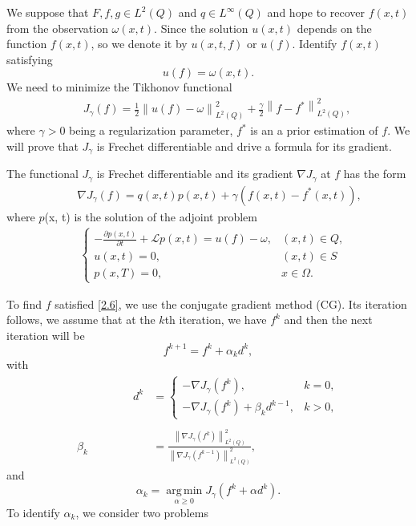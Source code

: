\documentclass[notitlepage,a4paper,fleqn,9pt]{icmfarticle}
\begin{document}
\begin{multicols}{2}
We suppose that $F, f, g \in L^2(Q)$ and $ q\in L^\infty(Q)$ and hope to recover $f(x, t)$ from the observation $\omega(x, t)$. Since the solution $u(x, t)$ depends on the function $f(x, t)$, so we denote it by $u(x, t, f)$ or $u(f)$. Identify $f(x, t)$ satisfying 
$$u(f)=\omega(x, t).$$ 
We need to minimize the Tikhonov functional
\begin{align}\label{2.6}
	\quad\;\; J_{\gamma}(f)=\frac{1}{2}\left\|u(f)-\omega\right\|_{L^2(Q)}^2+\frac{\gamma}{2}\left\|f-f^*\right\|_{L^2(Q)}^2,
\end{align}
where $\gamma>0$ being a regularization parameter, $f^*$ is an a prior estimation of $f$.
We will prove that $J_\gamma$ is Frechet differentiable and drive a formula for its gradient.
\begin{dl}
	The functional $J_\gamma$ is Frechet differentiable and its gradient $\nabla J_\gamma$ at $f$ has the form 
	\begin{align}\label{2.7}
		\qquad \nabla J_\gamma(f)=q(x, t)p(x, t)+\gamma \left(f(x, t)-f^*(x, t)\right),
	\end{align}
	where $p$(x, t) is the solution of the adjoint problem
	\begin{align}\label{2.5} 
		\quad\begin{cases}
		-\frac{\partial p(x, t)}{\partial t}+\mathcal{L}p(x, t)=u(f)-\omega, & (x, t)\in Q,\\
		u(x, t)=0, & (x, t)\in S\\
		p(x, T)=0, & x\in \Omega.
		\end{cases}
	\end{align}
\end{dl}
\noindent To find $f$ satisfied \eqref{2.6}, we use the conjugate gradient method (CG). Its iteration follows, we assume that at the $k$th iteration, we have $f^k$ and then the next iteration will be
$$f^{k+1}=f^k+\alpha_kd^k,$$
with
\begin{align*}
	\qquad\qquad\quad d^k&=\left\{\begin{array}{ll}
	-\nabla J_\gamma(f^k),& k=0,\\
	-\nabla J_\gamma(f^k)+\beta_kd^{k-1},& k>0,
	\end{array}\right.\\\\
	\beta_k&=\frac{\left\|\nabla J_\gamma (f^k)\right\|^2_{L^2(Q)}}{\left\|\nabla J_\gamma (f^{k-1})\right\|^2_{L^2(Q)}},
\end{align*}
and
$$\alpha_k=\operatorname*{arg\,min}_{\alpha\geq 0}J_\gamma(f^k+\alpha d^k).$$
To identify $\alpha_k$, we consider two problems

\end{multicols}
\end{document}
